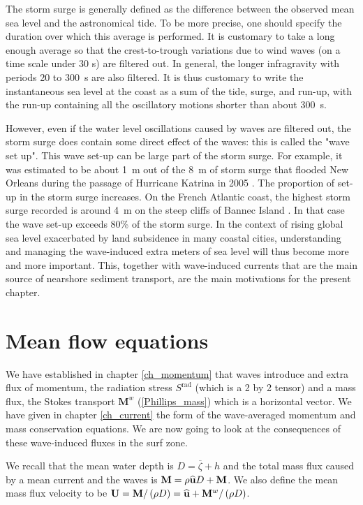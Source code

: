 The storm surge is generally defined as the difference between the observed mean sea level and the astronomical tide. To be more precise, one should specify the duration over which this average is performed. It is customary to take a long enough average so that the crest-to-trough variations due to wind waves (on a time scale under 30 s) are filtered out. In general, the longer infragravity with periods 20 to 300~s are also filtered. It is thus customary to write the instantaneous sea level at the coast as a sum of the tide, surge, and run-up, with the run-up containing all the oscillatory motions shorter than about 300~s. 

However, even if the water level oscillations caused by waves are filtered out, the storm surge does contain some direct effect of the waves: this is called the "wave set up". This wave set-up can be large part of the storm surge. For example, it was estimated to be about 1~m out of the 8~m of storm surge that flooded New Orleans during the passage of Hurricane Katrina in 2005  \citep{Resio&Westerink2008}. The proportion of set-up in the storm surge increases. On the French Atlantic coast, the highest storm surge recorded is around 4~m on the steep cliffs of Bannec Island \citep{Ardhuin&Magne2010,Sheremet&al.2014}. In that case the wave set-up exceeds 80\% of the storm surge. In the context of rising global sea level exacerbated by land subsidence in many coastal cities, understanding and managing the wave-induced extra meters of sea level will thus become more and more important. This, together with wave-induced currents that are the main source of nearshore sediment transport, are the main motivations for the present chapter. 

\section{Mean flow equations}
We have established in chapter \ref{ch_momentum} that waves introduce and extra flux of momentum, the radiation stress $S^{\mathrm{rad}}$ (which is a 2 by 2 tensor) and a mass flux, the Stokes transport ${\mathbf M^w}$ (\ref{Phillips_mass}) which is a horizontal vector. We have given in chapter \ref{ch_current} the form of the wave-averaged momentum and mass conservation equations. We are now going to look at the consequences of these wave-induced fluxes in the surf zone. 

We recall  that the mean water depth is 
$D=\overline{\zeta}+h$ and the total mass flux caused by a mean current and the waves is  ${\mathbf M}=\rho
{\mathbf {\widehat{u}}} D +{\mathbf M}$. We also define the mean mass flux velocity to be  ${\mathbf U}={\mathbf
M}/\left(\rho D\right) = {\mathbf {\widehat{u}}}+{\mathbf M^w}/\left(\rho
D\right)$. 

